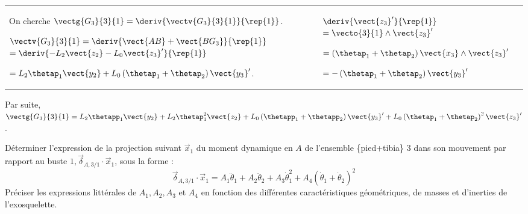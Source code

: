 \documentclass[11pt]{article}
\begin{document}
\begin{UPSTIcorrige}
\begin{tabular}{p{.68\linewidth}| p{.3\linewidth}}
On cherche $\vectg{G_3}{3}{1} = \deriv{\vectv{G_3}{3}{1}}{\rep{1}}$.

$\vectv{G_3}{3}{1} = \deriv{\vect{AB}+\vect{BG_3}}{\rep{1}}$
$= \deriv{-L_2 \vect{z_2} -L_0 \vect{z_3}'}{\rep{1}}$

$=L_2 \thetap_1\vect{y_2}  +L_0  \left(\thetap_1 + \thetap_2 \right)\vect{y_3}'$.
&
$\deriv{\vect{z_3}'}{\rep{1}} $ $=\vecto{3}{1}\wedge \vect{z_3}' $

$= \left(\thetap_1 + \thetap_2 \right)\vect{x_3} \wedge \vect{z_3}' $

$= - \left(\thetap_1 + \thetap_2 \right)\vect{y_3}' $ 
\\
\end{tabular}

Par suite, 
$\vectg{G_3}{3}{1} = L_2 \thetapp_1\vect{y_2}  +L_2 \thetap_1^2\vect{z_2}  + L_0  \left(\thetapp_1 + \thetapp_2 \right)\vect{y_3}'+ L_0  \left(\thetap_1 + \thetap_2 \right)^2\vect{z_3}'$.


\end{UPSTIcorrige}

\UPSTIquestion Déterminer l'expression de la projection suivant $\vec{x}_{1}$ du moment dynamique en $A$ de l'ensemble \{pied+tibia\} 3 dans son mouvement par rapport au buste $1, \vec{\delta}_{A, 3 / 1} \cdot \vec{x}_{1}$, sous la forme :
$$
\vec{\delta}_{A, 3 / 1} \cdot \vec{x}_{1}=A_{1} \ddot{\theta}_{1}+A_{2} \ddot{\theta}_{2}+A_{3} \dot{\theta}_{1}^{2}+A_{4}\left(\dot{\theta}_{1}+\dot{\theta}_{2}\right)^{2}
$$
Préciser les expressions littérales de $A_{1}, A_{2}, A_{3}$ et $A_{4}$ en fonction des différentes caractéristiques géométriques, de masses et d'inerties de l'exosquelette.
\end{document}
